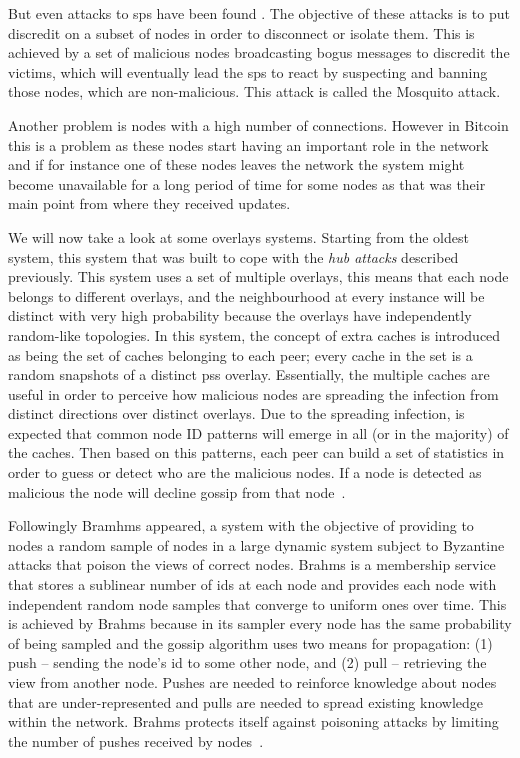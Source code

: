 But even attacks to \acrshort{sps} have been found \cite{jesi2009secure}. The objective of these attacks is to put discredit on a subset of nodes in order to disconnect or isolate them. This is achieved by a set of malicious nodes broadcasting bogus messages to discredit the victims, which will eventually lead the \acrshort{sps} to react by suspecting and banning those nodes, which are non-malicious. This attack is called the Mosquito attack.

Another problem is nodes with a high number of connections. However in Bitcoin this is a problem as these nodes start having an important role in the network and if for instance one of these nodes leaves the network the system might become unavailable for a long period of time for some nodes as that was their main point from where they received updates. 

We will now take a look at some overlays systems. Starting from the oldest system, this system that was built to cope with the \emph{hub attacks} described previously. This system uses a set of multiple overlays, this means that each node belongs to different overlays, and the neighbourhood at every instance will be distinct with very high probability because the overlays have independently random-like topologies. In this system, the concept of extra caches is introduced as being the set of caches belonging to each peer; every cache in the set is a random snapshots of a distinct \acrshort{pss} overlay. Essentially, the multiple caches are useful in order to perceive how malicious nodes are spreading the infection from distinct directions over distinct overlays. Due to the spreading infection, is expected that common node ID patterns will emerge in all (or in the majority) of the caches. Then based on this patterns, each peer can build a set of statistics in order to guess or detect who are the malicious nodes. If a node is detected as malicious the node will decline gossip from that node~\cite{jesi2007identifying}.

Followingly Bramhms appeared, a system with the objective of providing to nodes a random sample of nodes in a large dynamic system subject to Byzantine attacks that poison the views of correct nodes. Brahms is a membership service that stores a sublinear number of ids at each node and provides each node with independent random node samples that converge to uniform ones over time. This is achieved by Brahms because in its sampler every node has the same probability of being sampled and the gossip algorithm uses two means for propagation: (1) push – sending the node’s id to some other node, and (2) pull – retrieving the view from another node. Pushes are needed to reinforce knowledge about nodes that are under-represented and pulls are needed to spread existing knowledge within the network. Brahms protects itself against poisoning attacks by limiting the number of pushes received by nodes~\cite{bortnikov2009brahms}.

